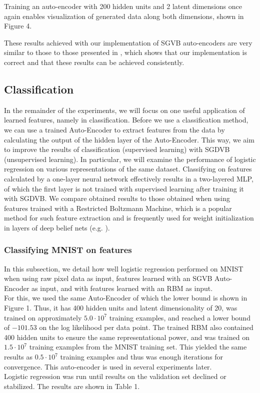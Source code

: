 \documentclass{article}
\begin{document}
Training an auto-encoder with 200 hidden units and 2 latent dimensions once again enables visualization of generated data along both dimensions, shown in Figure 4.

These results achieved with our implementation of SGVB auto-encoders are very similar to those to those presented in \cite{kingma2013auto}, which shows that our implementation is correct and that these results can be achieved consistently. 

\subsection{Classification}

In the remainder of the experiments, we will focus on one useful application of learned features, namely in classification. Before we use a classification method, we can use a trained Auto-Encoder to extract features from the data by calculating the output of the hidden layer of the Auto-Encoder. This way, we aim to improve the results of classification (supervised learning) with SGDVB (unsupervised learning). In particular, we will examine the performance of logistic regression on various representations of the same dataset. Classifying on features calculated by a one-layer neural network effectively results in a two-layered MLP, of which the first layer is not trained with supervised learning after training it with SGDVB. We compare obtained results to those obtained when using features trained with a Restricted Boltzmann Machine, which is a popular method \cite{bengio2009learning} for such feature extraction and is frequently used for weight initialization in layers of deep belief nets (e.g. \cite{bengio2007greedy} ).

\subsubsection{Classifying MNIST on features}

In this subsection, we detail how well logistic regression performed on MNIST when using raw pixel data as input, features learned with an SGVB Auto-Encoder as input, and with features learned with an RBM as input. \\ For this, we used the same Auto-Encoder of which the lower bound is shown in Figure 1. Thus, it has 400 hidden units and latent dimensionality of 20, was trained on approximately $5.0\cdot 10^7$ training examples, and reached a lower bound of $-101.53$ on the log likelihood per data point. The trained RBM also contained 400 hidden units to ensure the same representational power, and was trained on $1.5\cdot 10^7$ training examples from the MNIST training set. This yielded the same results as $0.5\cdot 10^7$ training examples and thus was enough iterations for convergence. This auto-encoder is used in several experiments later. \\
Logistic regression was run until results on the validation set declined or stabilized. The results are shown in Table 1.
\end{document}
